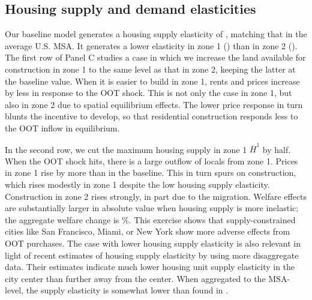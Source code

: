 \documentclass[letterpaper,12pt,dvipsnames,usenames]{article}
\theoremstyle{definition}
\begin{document}
\begin{spacing}{1.25}
{\subsection{Housing supply and demand elasticities}

Our baseline model generates a housing supply elasticity of \HSE, matching that in the average U.S. MSA. It generates a lower elasticity in zone 1 (\HSEone) than in zone 2 (\HSEtwo). The first row of Panel C studies a case in which we increase the land available for construction in zone 1 to the same level as that in zone 2, keeping the latter at the baseline value. When it is easier to build in zone 1, rents and prices increase by less in response to the OOT shock. This is not only the case in zone 1, but also in zone 2 due to spatial equilibrium effects. The lower price response in turn blunts the incentive to develop, so that residential construction responds less to the OOT inflow in equilibrium.

In the second row, we cut the maximum housing supply in zone 1 $\overline{H}^1$ by half. When the OOT shock hits, there is a large outflow of locals from zone 1. Prices in zone 1 rise by more than in the baseline. This in turn spurs on construction, which rises modestly in zone 1 despite the low housing supply elasticity. Construction in zone 2 rises strongly, in part due to the migration. Welfare effects are substantially larger in absolute value when housing supply is more inelastic; the aggregate welfare change is {}\%.  This exercise shows that supply-constrained cities like San Francisco, Miami, or New York show more adverse effects from OOT purchases. The case with lower housing supply elasticity is also relevant in light of recent estimates of housing supply elasticity by \citet{BaumHan2020} using more disaggregate data. Their estimates indicate much lower housing unit supply elasticity in the city center than further away from the center. When aggregated to the MSA-level, the supply elasticity is somewhat lower than found in \citet{Saiz:10}.

}
\end{spacing}
\end{document}

